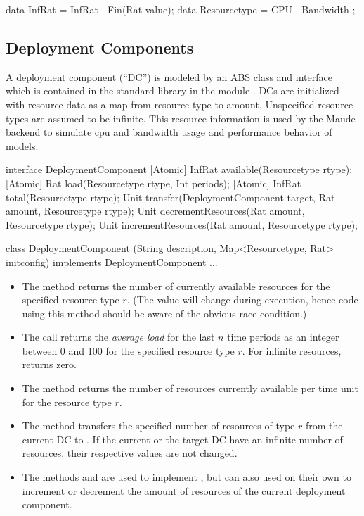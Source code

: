 \begin{absexample} 
data InfRat = InfRat | Fin(Rat value);
data Resourcetype = CPU | Bandwidth ;
\end{absexample} 

\subsection{Deployment Components}

A deployment component (``DC'') is modeled by an ABS class and interface
 which is contained in the standard library in
the module .  DCs are initialized with resource data as a
map from resource type to amount.  Unspecified resource types are assumed to
be infinite.  This resource information is used by the Maude backend to
simulate cpu and bandwidth usage and performance behavior of models.

\begin{absexample} 
interface DeploymentComponent {
    [Atomic] InfRat available(Resourcetype rtype);
    [Atomic] Rat load(Resourcetype rtype, Int periods);
    [Atomic] InfRat total(Resourcetype rtype);
    Unit transfer(DeploymentComponent target, Rat amount, Resourcetype rtype);
    Unit decrementResources(Rat amount, Resourcetype rtype);
    Unit incrementResources(Rat amount, Resourcetype rtype);
}

class DeploymentComponent (String description,
                           Map<Resourcetype, Rat> initconfig)
implements DeploymentComponent {
    ...
}
\end{absexample} 

\begin{itemize}
\item The method  returns the number of currently
  available resources for the specified resource type $r$.  (The value will
  change during execution, hence code using this method should be aware of the
  obvious race condition.)
\item The call  returns the \emph{average load} for the
  last $n$ time periods as an integer between 0 and 100 for the specified
  resource type $r$.  For infinite resources,  returns zero.
\item The method  returns the number of resources currently
  available per time unit for the resource type $r$.
\item The method  transfers the
  specified number of resources of type $r$ from the current DC to
  .  If the current or the target DC have an infinite number
  of resources, their respective values are not changed.
\item The methods  and
   are used to implement ,
  but can also used on their own to increment or decrement the amount of
  resources of the current deployment component.
\end{itemize}

